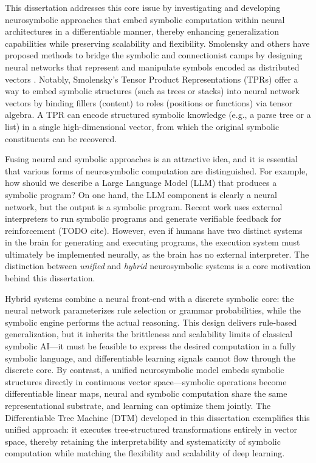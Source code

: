 This dissertation addresses this core issue by investigating and developing neurosymbolic approaches that embed symbolic computation within neural architectures in a differentiable manner, thereby enhancing generalization capabilities while preserving scalability and flexibility. Smolensky and others have proposed methods to bridge the symbolic and connectionist camps by designing neural networks that represent and manipulate symbols encoded as distributed vectors \citep{Smolensky1990TensorPV,gayler2003vsa_jackendoff,plate,pollack_recursive_1990}. Notably, Smolensky’s Tensor Product Representations (TPRs) offer a way to embed symbolic structures (such as trees or stacks) into neural network vectors by binding fillers (content) to roles (positions or functions) via tensor algebra. A TPR can encode structured symbolic knowledge (e.g., a parse tree or a list) in a single high-dimensional vector, from which the original symbolic constituents can be recovered.

Fusing neural and symbolic approaches is an attractive idea, and it is essential that various forms of neurosymbolic computation are distinguished. For example, how should we describe a Large Language Model (LLM) that produces a symbolic program? On one hand, the LLM component is clearly a neural network, but the output is a symbolic program. Recent work uses external interpreters to run symbolic programs and generate verifiable feedback for reinforcement (TODO cite). However, even if humans have two distinct systems in the brain for generating and executing programs, the execution system must ultimately be implemented neurally, as the brain has no external interpreter. The distinction between \textit{unified} and \textit{hybrid} neurosymbolic systems is a core motivation behind this dissertation.

Hybrid systems combine a neural front‑end with a discrete symbolic core: the neural network parameterizes rule selection or grammar probabilities, while the symbolic engine performs the actual reasoning. This design delivers rule‑based generalization, but it inherits the brittleness and scalability limits of classical symbolic AI—it must be feasible to express the desired computation in a fully symbolic language, and differentiable learning signals cannot flow through the discrete core. By contrast, a unified neurosymbolic model embeds symbolic structures directly in continuous vector space—symbolic operations become differentiable linear maps, neural and symbolic computation share the same representational substrate, and learning can optimize them jointly. The Differentiable Tree Machine (DTM) developed in this dissertation exemplifies this unified approach: it executes tree‐structured transformations entirely in vector space, thereby retaining the interpretability and systematicity of symbolic computation while matching the flexibility and scalability of deep learning.

